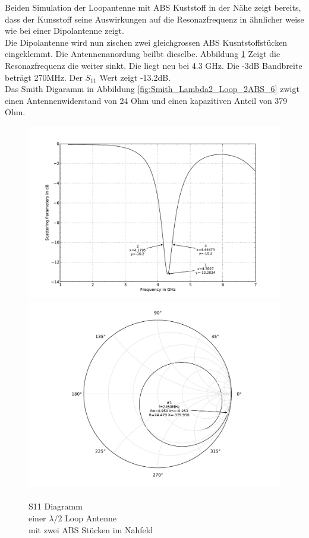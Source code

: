 Beiden Simulation der Loopantenne mit ABS Kuststoff in der Nähe zeigt bereits, dass der Kunsstoff seine Auswirkungen auf die Resonazfrequenz in ähnlicher weise wie bei einer Dipolantenne zeigt.\\
Die Dipolantenne wird nun zischen zwei gleichgrossen ABS Kusntstoffstücken eingeklemmt. Die Antennenanordung beilbt dieselbe. Abbildung \ref{fig:S11_Lambda2_Loop_2ABS_5} Zeigt die Resonazfrequenz die weiter sinkt. Die liegt neu bei 4.3 GHz. Die -3dB Bandbreite beträgt 270MHz. Der $S_{11}$ Wert zeigt -13.2dB.\\
Das Smith Digaramm in Abbildung \ref{fig:Smith_Lambda2_Loop_2ABS_6} zwigt einen Antennenwiderstand von 24 Ohm und einen kapazitiven Anteil von 379 Ohm.
\begin{figure}[!h]
	\begin{center}
 	\includegraphics[width=\linewidth]{content/bilder/Evaluation/Loop/L2/2ABS/S11_Loop_Lambda2_mit2ABS.pdf}
  	\caption{\\S11 Diagramm \\einer $\lambda/2$ Loop Antenne \\mit zwei ABS Stücken im Nahfeld}				\label{fig:S11_Lambda2_Loop_2ABS_5}
\endminipage%
 	\includegraphics[width=\linewidth]{content/bilder/Evaluation/Loop/L2/2ABS/Smith_Loop_Lambda2_mit2ABS.pdf}

\end{center}
\end{figure}
